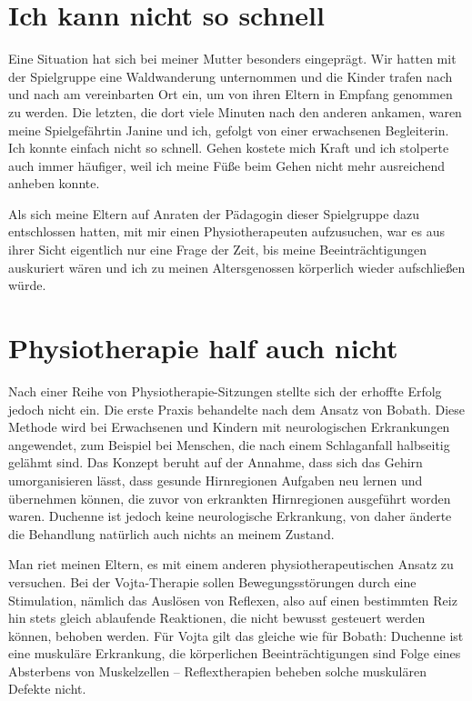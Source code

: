 \documentclass[fontsize=12pt,a4paper,headinclude,DIV=calc,automark]{scrbook}
\begin{document}
\section{Ich kann nicht so schnell}

Eine Situation hat sich bei meiner Mutter besonders eingeprägt. Wir hatten mit der Spielgruppe eine Waldwanderung unternommen und die Kinder trafen nach und nach am vereinbarten Ort ein, um von ihren Eltern in Empfang genommen zu werden. Die letzten, die dort viele Minuten nach den anderen ankamen, waren meine Spielgefährtin Janine und ich, gefolgt von einer erwachsenen Begleiterin. Ich konnte einfach nicht so schnell. Gehen kostete mich Kraft und ich stolperte auch immer häufiger, weil ich meine Füße beim Gehen nicht mehr ausreichend anheben konnte.

Als sich meine Eltern auf Anraten der Pädagogin dieser Spielgruppe dazu entschlossen hatten, mit mir einen Physiotherapeuten aufzusuchen, war es aus ihrer Sicht eigentlich nur eine Frage der Zeit, bis meine Beeinträchtigungen auskuriert wären und ich zu meinen Altersgenossen körperlich wieder aufschließen würde.

\section{Physiotherapie half auch nicht}

Nach einer Reihe von Physiotherapie-Sitzungen stellte sich der erhoffte Erfolg jedoch nicht ein. Die erste Praxis behandelte nach dem Ansatz von Bobath. Diese Methode wird bei Erwachsenen und Kindern mit neurologischen Erkrankungen angewendet, zum Beispiel bei Menschen, die nach einem Schlaganfall halbseitig gelähmt sind. Das Konzept beruht auf der Annahme, dass sich das Gehirn umorganisieren lässt, dass gesunde Hirnregionen Aufgaben neu lernen und übernehmen können, die zuvor von erkrankten Hirnregionen ausgeführt worden waren. Duchenne ist jedoch keine neurologische Erkrankung, von daher änderte die Behandlung natürlich auch nichts an meinem Zustand.

Man riet meinen Eltern, es mit einem anderen physiotherapeutischen Ansatz zu versuchen. Bei der Vojta-Therapie sollen Bewegungsstörungen durch eine Stimulation, nämlich das Auslösen von Reflexen, also auf einen bestimmten Reiz hin stets gleich ablaufende Reaktionen, die nicht bewusst gesteuert werden können, behoben werden. Für Vojta gilt das gleiche wie für Bobath: Duchenne ist eine muskuläre Erkrankung, die körperlichen Beeinträchtigungen sind Folge eines Absterbens von Muskelzellen – Reflextherapien beheben solche muskulären Defekte nicht.
\end{document}
